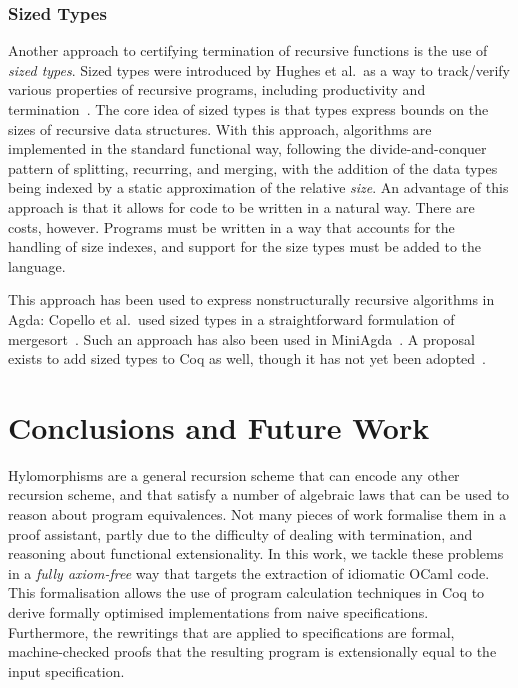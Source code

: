\documentclass[ a4paper, UKenglish, cleveref, autoref, thm-restate]{lipics-v2021}
\begin{document}
\subsubsection{Sized Types}\label{sec:sizedT}

Another approach to certifying termination of recursive functions is the use of
\emph{sized types}. Sized types were introduced by Hughes et al.\ as a way to
track/verify various properties of recursive programs, including productivity
and termination~\cite{HughesPS96}. The core idea of sized types is that types
express bounds on the sizes of recursive data structures. With this approach,
algorithms are implemented in the standard functional way, following the
divide-and-conquer pattern of splitting, recurring, and merging, with the
addition of the data types being indexed by a static approximation of the
relative \emph{size}. An advantage of this approach is that it allows for code
to be written in a natural way. There are costs, however. Programs must be
written in a way that accounts for the handling of size indexes, and support for
the size types must be added to the language.

This approach has been used to express nonstructurally recursive
algorithms in Agda: Copello et al.\ used sized types in a straightforward
formulation of mergesort~\cite{CopelloTB14}. Such an approach has also been used
in MiniAgda~\cite{abs-1202-3496}. A proposal exists to add sized types to
Coq as well, though it has not yet been adopted~\cite{CHAN_2023}.


\section{Conclusions and Future Work}

Hylomorphisms are a general recursion scheme that can encode any other
recursion scheme, and that satisfy a number of algebraic laws that can be used
to reason about program equivalences. Not many
pieces of work formalise them in a proof assistant, partly due to the
difficulty of dealing with termination, and reasoning about functional
extensionality. In this work, we tackle these problems in a \emph{fully
axiom-free} way that targets the extraction of idiomatic OCaml code.  This
formalisation allows the use of program calculation techniques in Coq to derive
formally optimised implementations from naive specifications. Furthermore, the
rewritings that are applied to specifications are formal, machine-checked
proofs that the resulting program is extensionally equal to the input
specification. 
\end{document}
